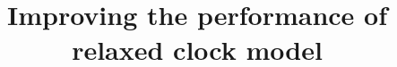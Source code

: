 \documentclass{bmcart}
\begin{document}
\begin{frontmatter}
\begin{fmbox}


\title{Improving the performance of relaxed clock model}


\author[
   addressref={aff1},                   %
   corref={aff1},                       %
   email={alexei@cs.auckland.ac.nz}   %
]{\inits{} }
\author[
   addressref={aff1},
   email={rzha419@aucklanduni.ac.nz}
]{\inits{} }


\address[id=aff1]{%
  , %
  ,                     %
  ,                              %
}



\end{fmbox}
\end{frontmatter}
\end{document}
